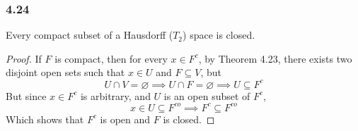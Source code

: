 \documentclass[../../main.tex]{subfiles}
\begin{document}
\subsubsection*{4.24}
\begin{wts}
Every compact subset of a Hausdorff ($T_2$) space is closed.
\end{wts}
\begin{proof}
If $F$ is compact, then for every $x\in F^c$, by Theorem 4.23, there exists two disjoint open sets such that $x\in U$ and $F\subseteq V$, but 
\[
U\cap V = \varnothing\implies U\cap F=\varnothing\implies U\subseteq F^c
\]
But since $x\in F^c$ is arbitrary, and $U$ is an open subset of $F^c$, 
\[
x\in U\subseteq F^{co}\implies F^c\subseteq F^{co}
\]
Which shows that $F^c$ is open and $F$ is closed.
\end{proof}
\end{document}
